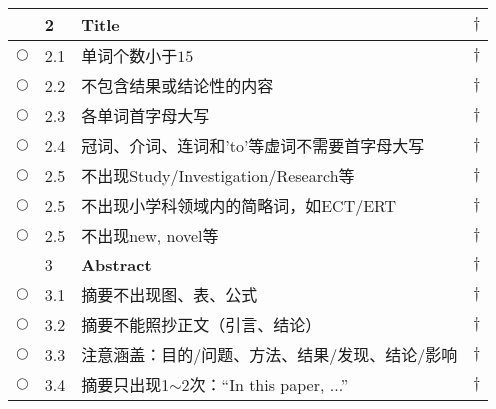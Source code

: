 \documentclass{ctexart}
\begin{document}
\begin{center}
\begin{longtable}{|l|l|p{}|l|}
 & 2 & \textcolor[rgb]{0.00,0.00,1.00}{\textbf{Title}}& $\dagger$\\\hline
$\bigcirc$ & 2.1 & 单词个数小于$15$& $\dagger$\\\hline
$\bigcirc$ & 2.2 & 不包含结果或结论性的内容 & $\dagger$\\\hline
$\bigcirc$ & 2.3 & 各单词首字母大写& $\dagger$\\\hline
$\bigcirc$ & 2.4 & 冠词、介词、连词和'to'等虚词不需要首字母大写& $\dagger$\\\hline
$\bigcirc$ & 2.5 & 不出现Study/Investigation/Research等& $\dagger$\\\hline
$\bigcirc$ & 2.5 & 不出现小学科领域内的简略词，如ECT/ERT& $\dagger$\\\hline
$\bigcirc$ & 2.5 & 不出现new, novel等& $\dagger$\\\hline
\hline


$ $ & 3 & \textcolor[rgb]{0.00,0.00,1.00}{\textbf{Abstract}}& $\dagger$\\\hline
$\bigcirc$ & 3.1 & 摘要不出现图、表、公式& $\dagger$\\\hline
$\bigcirc$ & 3.2 & 摘要不能照抄正文（引言、结论）& $\dagger$\\\hline
$\bigcirc$ & 3.3 & 注意涵盖：目的/问题、方法、结果/发现、结论/影响& $\dagger$\\\hline
$\bigcirc$ & 3.4 & 摘要只出现1$\sim$2次：“In this paper, ...”& $\dagger$\\\hline
\hline


\end{longtable}
\end{center}
\end{document}

